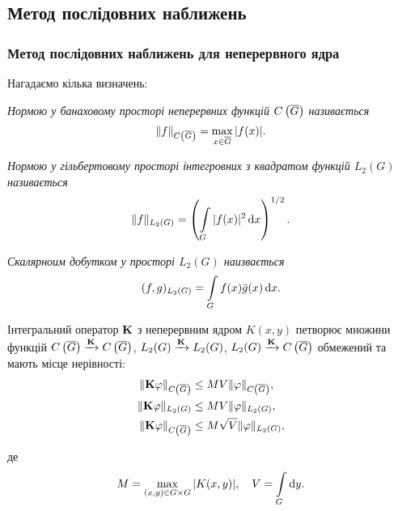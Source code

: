 \subsection{Метод послідовних наближень}

\subsubsection{Метод послідовних наближень для неперервного ядра}

Нагадаємо кілька визначень:
\begin{definition}
	\it{Нормою} у банаховому просторі неперервних функцій $\CoG$ називається
	\begin{equation}
		\|f\|_{\CoG} = \Max_{x \in \oG} |f(x)|.
	\end{equation}
\end{definition}

\begin{definition}[норми у $L_2(G)$]
	\it{Нормою} у гільбертовому просторі інтегровних з квадратом функцій $L_2(G)$ називається
	\begin{equation}
		\|f\|_{L_2(G)} = \left( \Int_G |f(x)|^2 \diff x \right)^{1/2}.
	\end{equation}
\end{definition}

\begin{definition}
	\it{Скалярноим добутком} у просторі $L_2(G)$ наизвається
	\begin{equation}
		(f, g)_{L_2(G)} = \Int_G f(x) \bar g(x) \diff x.
	\end{equation}
\end{definition}

\begin{lemma} 
	\label{neravenstvo-dla-normy-operatora}
	Інтегральний оператор $\bf{K}$ з неперервним ядром $K(x, y)$ петворює множини функцій $\CoG \xrightarrow{\bf{K}} \CoG$, $L_2(G) \xrightarrow{\bf{K}} L_2(G)$, $L_2(G) \xrightarrow{\bf{K}} \CoG$ обмежений та мають місце нерівності:
	\begin{align}
		\| \bf{K} \phi \|_{\CoG} &\le M V \| \phi \|_{\CoG}, \\
		\| \bf{K} \phi \|_{L_2(G)} &\le M V \| \phi \|_{L_2(G)}, \\
		\| \bf{K} \phi \|_{\CoG} &\le M \sqrt{V} \| \phi \|_{L_2(G)},
	\end{align}

	де
	\begin{equation}
		M = \Max_{(x, y) \in G \times G} |K(x, y)|, \quad V = \Int_G \diff y.
	\end{equation}
\end{lemma}

